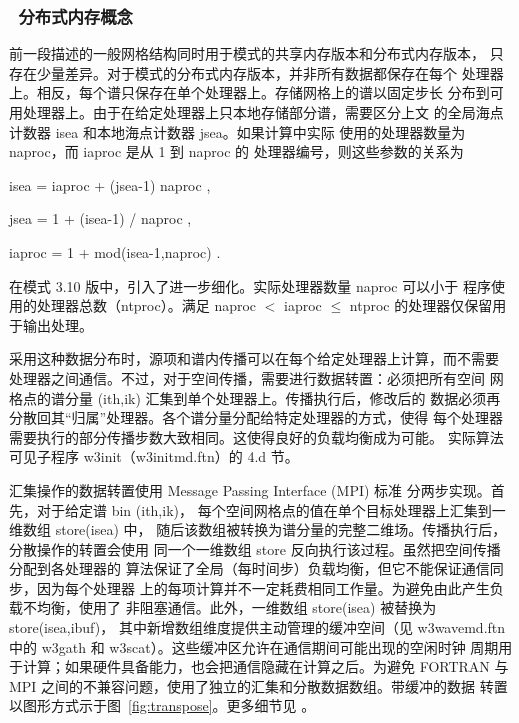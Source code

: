 \vsssub
\subsubsection{~分布式内存概念} \label{sec:distr}
\vsssub

前一段描述的一般网格结构同时用于模式的共享内存版本和分布式内存版本，
只存在少量差异。对于模式的分布式内存版本，并非所有数据都保存在每个
处理器上。相反，每个谱只保存在单个处理器上。存储网格上的谱以固定步长
分布到可用处理器上。由于在给定处理器上只本地存储部分谱，需要区分上文
的全局海点计数器 {\F isea} 和本地海点计数器 {\F jsea}。如果计算中实际
使用的处理器数量为 {\F naproc}，而 {\F iaproc} 是从 1 到 {\F naproc} 的
处理器编号，则这些参数的关系为

\vspace{\baselineskip}
\centerline{\F isea = iaproc + (jsea-1) naproc ,}
\centerline{\F jsea = 1 + (isea-1) / naproc ,}
\centerline{\F iaproc = 1 + mod(isea-1,naproc) .}
\vspace{\baselineskip}

\noindent
在模式 3.10 版中，引入了进一步细化。实际处理器数量 {\F naproc} 可以小于
程序使用的处理器总数（{\F ntproc}）。满足 {\F naproc} $<$ {\F iaproc}
$\le$ {\F ntproc} 的处理器仅保留用于输出处理。

采用这种数据分布时，源项和谱内传播可以在每个给定处理器上计算，而不需要
处理器之间通信。不过，对于空间传播，需要进行数据转置：必须把所有空间
网格点的谱分量 {\F(ith,ik)} 汇集到单个处理器上。传播执行后，修改后的
数据必须再分散回其“归属”处理器。各个谱分量分配给特定处理器的方式，使得
每个处理器需要执行的部分传播步数大致相同。这使得良好的负载均衡成为可能。
实际算法可见子程序 {\F w3init}（{\file w3initmd.ftn}）的 4.d 节。

汇集操作的数据转置使用 Message Passing Interface (MPI) 标准
\citep[例如][]{bk:GLS97} 分两步实现。首先，对于给定谱 bin {\F(ith,ik)}，
每个空间网格点的值在单个目标处理器上汇集到一维数组 {\F store(isea)} 中，
随后该数组被转换为谱分量的完整二维场。传播执行后，分散操作的转置会使用
同一个一维数组 {\F store} 反向执行该过程。虽然把空间传播分配到各处理器的
算法保证了全局（每时间步）负载均衡，但它不能保证通信同步，因为每个处理器
上的每项计算并不一定耗费相同工作量。为避免由此产生负载不均衡，使用了
非阻塞通信。此外，一维数组 {\F store(isea)} 被替换为 {\F store(isea,ibuf)}，
其中新增数组维度提供主动管理的缓冲空间（见 {\file w3wavemd.ftn} 中的
{\F w3gath} 和 {\F w3scat}）。这些缓冲区允许在通信期间可能出现的空闲时钟
周期用于计算；如果硬件具备能力，也会把通信隐藏在计算之后。为避免 FORTRAN
与 MPI 之间的不兼容问题，使用了独立的汇集和分散数据数组。带缓冲的数据
转置以图形方式示于图~\ref{fig:transpose}。更多细节见 \cite{tol:PACO02}。

